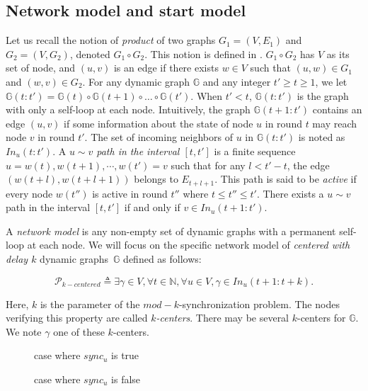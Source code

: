 \documentclass[11pt,letterpaper]{article}
\newcommand{\cent}{\gamma}
\begin{document}
\subsection{Network model and start model}

Let us recall the notion of \textit{product} of two graphs $G_1 = (V, E_1)$ and $G_2 = (V, G_2)$, denoted $G_1 \circ G_2$. This notion is defined in \cite{CBM19}.
$G_1 \circ G_2$ has $V$ as its set of node, and $(u,v)$ is an edge if there exists $w \in V$ such that $(u,w) \in G_1$ and $(w,v) \in G_2$.
For any dynamic graph $\mathds{G}$ and any integer $t' \geq t \geq 1$, we let $\mathds{G}(t:t') = \mathds{G}(t) \circ \mathds{G}(t+1) \circ \dots \circ \mathds{G}(t')$.
When $t' < t$, $\mathds{G}(t:t')$ is the graph with only a self-loop at each node.
Intuitively, the graph $\mathds{G}(t+1:t')$ contains an edge $(u,v)$ if some information about the state of node $u$ in round $t$ may reach node $v$ in round $t'$.
The set of incoming neighbors of $u$ in $\mathds{G}(t:t')$ is noted as $In_u(t:t')$.
A \textit{$u \sim v$ path in the interval $[t,t']$} is a finite sequence $u = w(t), w(t+1), \cdots, w(t') = v$
such that for any $l < t'-t$, the edge $(w(t+l),w(t+l+1))$ belongs to $E_{t+l+1}$.
This path is said to be \textit{active} if every node $w(t'')$ is active in round $t''$ where $t \leq t'' \leq t'$.
There exists a $u \sim v$ path in the interval $[t,t']$ if and only if $v \in In_u(t+1:t')$.

A \emph{network model} is any non-empty set of dynamic graphs with a permanent self-loop at each node.
We will focus on the specific network model of \emph{centered with delay $k$} dynamic graphs~$\mathds{G}$ defined as follows: 

$$\mathcal{P}_{k-centered} \triangleq \exists \cent \in V, \forall t \in \mathds{N}, \forall u \in V, \cent \in In_u(t+1:t+k).$$

Here, $k$ is the parameter of the $mod-k$-synchronization problem.
The nodes verifying this property are called \textit{$k$-centers}.
There may be several $k$-centers for $\mathds{G}$.
We note $\cent$ one of these $k$-centers.

\begin{figure}[h]
    \centering
    \def\svgwidth{0.8\columnwidth}
	
	\caption{case where $sync_u$ is true}
	\label{fig:fig1}
\end{figure}

\begin{figure}[h]
    \centering
    \def\svgwidth{0.8\columnwidth}
	
	\caption{case where $sync_u$ is false}
	\label{fig:fig2}
\end{figure}
\end{document}
